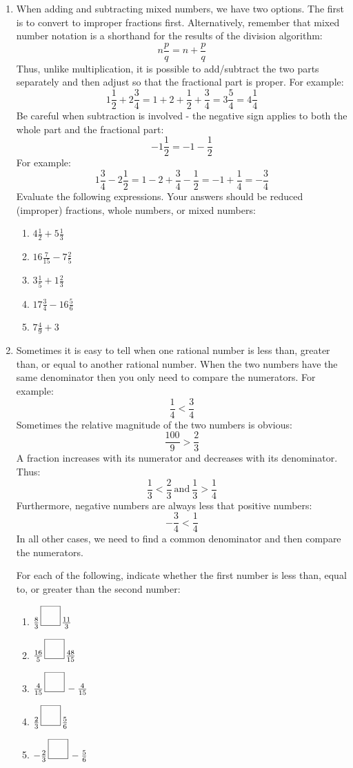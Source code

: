 \documentclass[letterpaper,12pt,fleqn]{article}
\begin{document}
\begin{enumerate}
\item When adding and subtracting mixed numbers, we have two options. The
  first is to convert to improper fractions first. Alternatively, remember that
  mixed number notation is a shorthand for the results of the division
  algorithm:
  \[n\frac{p}{q}=n+\frac{p}{q}\]
  Thus, unlike multiplication, it is possible to add/subtract the two parts
  separately and then adjust so that the fractional part is proper. For
  example:
  \[1\frac{1}{2}+2\frac{3}{4}=1+2+\frac{1}{2}+\frac{3}{4}=3\frac{5}{4}=
  4\frac{1}{4}\]
  Be careful when subtraction is involved - the negative sign applies to both
  the whole part and the fractional part: 
  \[-1\frac{1}{2}=-1-\frac{1}{2}\]
  For example:
  \[1\frac{3}{4}-2\frac{1}{2}=1-2+\frac{3}{4}-\frac{1}{2}=-1+\frac{1}{4}=
  -\frac{3}{4}\]
  Evaluate the following expressions. Your answers should be reduced (improper)
  fractions, whole numbers, or mixed numbers:
  \begin{enumerate}
  \item $4\frac{1}{2}+5\frac{1}{3}$
  \item $16\frac{7}{15}-7\frac{2}{5}$
  \item $3\frac{1}{5}+1\frac{2}{3}$
  \item $17\frac{3}{4}-16\frac{5}{6}$
  \item $7\frac{4}{9}+3$
  \end{enumerate}

\item Sometimes it is easy to tell when one rational number is less than,
  greater than, or equal to another rational number. When the two numbers have
  the same denominator then you only need to compare the numerators. For
  example:
  \[\frac{1}{4}<\frac{3}{4}\]
  Sometimes the relative magnitude of the two numbers is obvious:
  \[\frac{100}{9}>\frac{2}{3}\]
  A fraction increases with its numerator and decreases with its denominator.
  Thus:
  \[\frac{1}{3}<\frac{2}{3}\ \mbox{and}\ \frac{1}{3}>\frac{1}{4}\]
  Furthermore, negative numbers are always less that positive numbers:
  \[-\frac{3}{4}<\frac{1}{4}\]
  In all other cases, we need to find a common denominator and then compare the
  numerators.

  For each of the following, indicate whether the first number is less than,
  equal to, or greater than the second number:
  \begin{enumerate}
  \item $\frac{8}{3}\,\framebox(20,20){}\,\frac{11}{3}$
  \item $\frac{16}{5}\,\framebox(20,20){}\,\frac{48}{15}$
  \item $\frac{4}{15}\,\framebox(20,20){}\,-\frac{4}{15}$
  \item $\frac{2}{3}\,\framebox(20,20){}\,\frac{5}{6}$
  \item $-\frac{2}{3}\,\framebox(20,20){}\,-\frac{5}{6}$
  \end{enumerate}


\end{enumerate}
\end{document}
